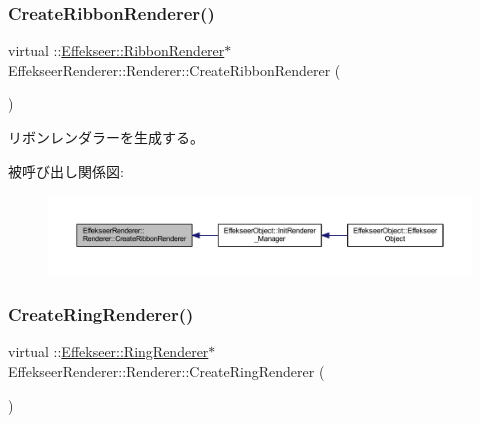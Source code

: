 \subsubsection{\texorpdfstring{Create\+Ribbon\+Renderer()}{CreateRibbonRenderer()}}
{\footnotesize\ttfamily virtual \+::\mbox{\hyperlink{class_effekseer_1_1_ribbon_renderer}{Effekseer\+::\+Ribbon\+Renderer}}$\ast$ Effekseer\+Renderer\+::\+Renderer\+::\+Create\+Ribbon\+Renderer (\begin{DoxyParamCaption}{ }\end{DoxyParamCaption})\hspace{0.3cm}{\ttfamily [pure virtual]}}



リボンレンダラーを生成する。 

被呼び出し関係図\+:\nopagebreak
\begin{figure}[H]
\begin{center}
\leavevmode
\includegraphics[width=350pt]{class_effekseer_renderer_1_1_renderer_ac65157c02f8936e054c2525e4722a4f7_icgraph}
\end{center}
\end{figure}
\mbox{\label{class_effekseer_renderer_1_1_renderer_a84dec1c70cab5984ce151753b5c9bcb9}} 
\subsubsection{\texorpdfstring{Create\+Ring\+Renderer()}{CreateRingRenderer()}}
{\footnotesize\ttfamily virtual \+::\mbox{\hyperlink{class_effekseer_1_1_ring_renderer}{Effekseer\+::\+Ring\+Renderer}}$\ast$ Effekseer\+Renderer\+::\+Renderer\+::\+Create\+Ring\+Renderer (\begin{DoxyParamCaption}{ }\end{DoxyParamCaption})\hspace{0.3cm}{\ttfamily [pure virtual]}}




